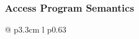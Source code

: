 \documentclass[12pt]{article}
\newcommand{\colDescrip}{0.63\textwidth}
\newcommand{\funcPadding}{1.3}
\newcommand{\newfunc}{\\[1.5em]}
\begin{document}
\subsubsection{Access Program Semantics} \label{SecAPSShape}
	\renewcommand*{\arraystretch}{\funcPadding}
	\begin{longtable*}{@{} p{3.3cm} l p{\colDescrip}} 
%		
%		
%		
%		

\end{longtable*}
\end{document}
